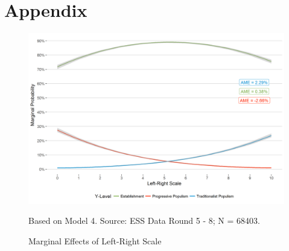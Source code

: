 \newpage
\section*{Appendix}
\pagestyle{plain}

\setcounter{table}{0}
\renewcommand{\thetable}{A\arabic{table}}

\setcounter{figure}{0}
\renewcommand{\thefigure}{A\arabic{figure}}

\begin{figure}[!h]
	\caption{Marginal Effects of Left-Right Scale}
	\label{lrscale_probs}
	\includegraphics[width=\textwidth]{images/lrscale_probs.png}
	\flushright
	{\scriptsize Based on Model 4. Source: ESS Data Round 5 - 8; N = 68403. \par}
\end{figure}





